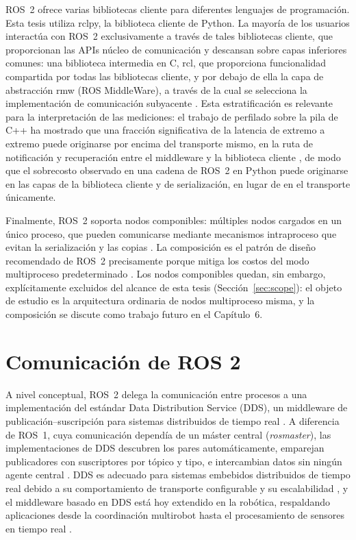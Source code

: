 ROS~2 ofrece varias bibliotecas cliente para diferentes lenguajes de
programación. Esta tesis utiliza rclpy, la biblioteca cliente de Python. La
mayoría de los usuarios interactúa con ROS~2 exclusivamente a través de tales
bibliotecas cliente, que proporcionan las APIs núcleo de comunicación y
descansan sobre capas inferiores comunes: una biblioteca intermedia en C,
rcl, que proporciona funcionalidad compartida por todas las bibliotecas
cliente, y por debajo de ella la capa de abstracción rmw (ROS MiddleWare), a
través de la cual se selecciona la implementación de comunicación
subyacente \cite{macenski2022, zotero-item-9}. Esta estratificación es
relevante para la interpretación de las mediciones: el trabajo de perfilado
sobre la pila de C++ ha mostrado que una fracción significativa de la
latencia de extremo a extremo puede originarse por encima del transporte
mismo, en la ruta de notificación y recuperación entre el middleware y la
biblioteca cliente \cite{kronauer2021, kamiya2025}, de modo que el sobrecosto observado en una cadena de
ROS~2 en Python puede originarse en las capas de la biblioteca cliente y de
serialización, en lugar de en el transporte únicamente.

Finalmente, ROS~2 soporta nodos componibles: múltiples nodos cargados en un
único proceso, que pueden comunicarse mediante mecanismos intraproceso que
evitan la serialización y las copias \cite{macenski2023}. La composición es
el patrón de diseño recomendado de ROS~2 precisamente porque mitiga los
costos del modo multiproceso predeterminado \cite{macenski2022,macenski2023}.
Los nodos componibles quedan, sin embargo, explícitamente excluidos del
alcance de esta tesis (Sección~\ref{sec:scope}): el objeto de estudio es la
arquitectura ordinaria de nodos multiproceso misma, y la composición se
discute como trabajo futuro en el Capítulo~6.

\section{Comunicación de ROS 2}
\label{sec:ros2-communication}

A nivel conceptual, ROS~2 delega la comunicación entre procesos a una
implementación del estándar Data Distribution Service (DDS), un middleware
de publicación--suscripción para sistemas distribuidos de tiempo real
\cite{gambo2025, macenski2022}. A diferencia de ROS~1, cuya comunicación
dependía de un máster central (\emph{rosmaster}), las implementaciones de
DDS descubren los pares automáticamente, emparejan publicadores con
suscriptores por tópico y tipo, e intercambian datos sin ningún agente
central \cite{macenski2022, gambo2025}. DDS es adecuado para sistemas
embebidos distribuidos de tiempo real debido a su comportamiento de
transporte configurable y su escalabilidad \cite{maruyama2016}, y el
middleware basado en DDS está hoy extendido en la robótica, respaldando
aplicaciones desde la coordinación multirobot hasta el procesamiento de
sensores en tiempo real \cite{gambo2025}.

